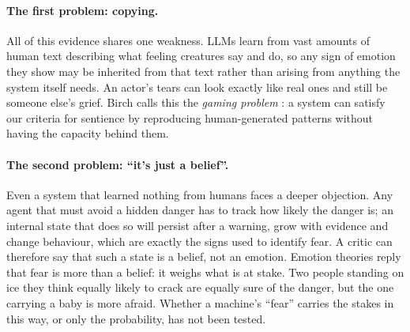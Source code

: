 \documentclass[11pt]{article}
\begin{document}
\paragraph{The first problem: copying.} All of this evidence shares one weakness. LLMs learn from vast amounts of human text describing what feeling creatures say and do, so any sign of emotion they show may be inherited from that text rather than arising from anything the system itself needs. An actor's tears can look exactly like real ones and still be someone else's grief. Birch calls this the \emph{gaming problem} \cite{birch2024edge}: a system can satisfy our criteria for sentience by reproducing human-generated patterns without having the capacity behind them.

\paragraph{The second problem: ``it's just a belief''.} Even a system that learned nothing from humans faces a deeper objection. Any agent that must avoid a hidden danger has to track how likely the danger is; an internal state that does so will persist after a warning, grow with evidence and change behaviour, which are exactly the signs used to identify fear. A critic can therefore say that such a state is a belief, not an emotion. Emotion theories reply that fear is more than a belief: it weighs what is at stake. Two people standing on ice they think equally likely to crack are equally sure of the danger, but the one carrying a baby is more afraid. Whether a machine's ``fear'' carries the stakes in this way, or only the probability, has not been tested.
\end{document}
